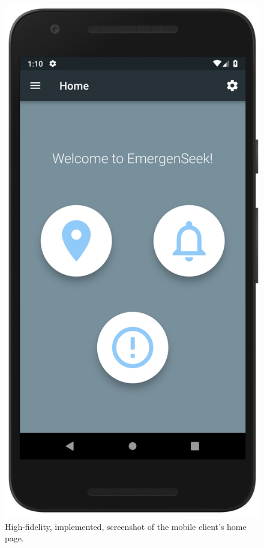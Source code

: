 \documentclass[10pt, a4paper]{article}
\begin{document}
\begin{figure}[H]
  \includegraphics[width=\linewidth]{demo_home.png}
  \caption{High-fidelity, implemented, screenshot of the mobile client's home page.}\label{fig:mobile1}

\end{figure}
\end{document}

